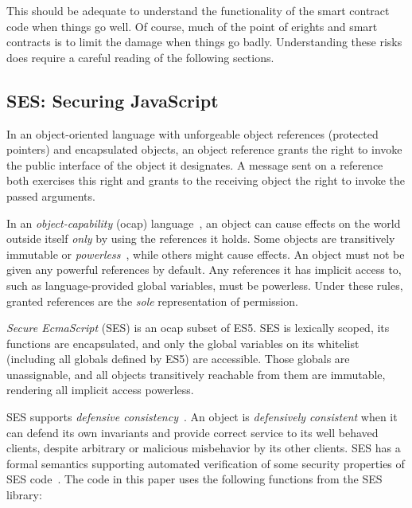 \documentclass{llncs}
\begin{document}
This should be adequate to understand the functionality of the smart contract code when things go well. Of course, much of the point of erights and smart contracts is to limit the damage when things go badly. Understanding these risks does require a careful reading of the following sections.
 

\subsection{SES: Securing JavaScript}
\label{ses}

In an object-oriented language with unforgeable object references (protected pointers) and encapsulated objects, an object reference grants the right to invoke the public interface of the object it designates. A message sent on a reference both exercises this right and grants to the receiving object the right to invoke the passed arguments. 

In an \emph{object-capability} (ocap) language~\cite{RobustComposition}, an object can cause effects on the world outside itself \emph{only} by using the references it holds. Some objects are transitively immutable or \emph{powerless}~\cite{Mettler:EECS-2012-244}, while others might cause effects. An object must not be given any powerful references by default. Any references it has implicit access to, such as language-provided global variables, must be powerless. Under these rules, granted references are the \emph{sole} representation of permission.

\emph{Secure EcmaScript} (SES) is an ocap subset of ES5. SES is lexically scoped, its functions are encapsulated, and only the global variables on its whitelist (including all globals defined by ES5) are accessible. Those globals  are unassignable, and all objects transitively reachable from them are immutable, rendering all implicit access powerless. 

SES supports \emph{defensive consistency}~\cite{RobustComposition}. An object is \emph{defensively consistent} when it can defend its own invariants and provide correct service to its well behaved clients, despite arbitrary or malicious misbehavior by its other clients. SES has a formal semantics supporting automated verification of some security properties of SES code~\cite{taly2011automated}. The code in this paper uses the following functions from the SES library:
\end{document}
